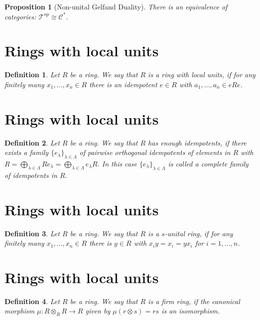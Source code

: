 \documentclass{amsart}
\newtheorem{proposition}{Proposition}[section]
\newtheorem{definition}{Definition}[section]
\begin{document}
\begin{proposition}[Non-unital Gelfand Duality]
There is an equivalence of categories: $\mathcal{T}^{op}\cong \mathcal{C}^*$.
\end{proposition}

\cite{murphy2014c}

\section{Rings with local units}

\begin{definition}
Let $R$ be a ring. We say that $R$ is a ring with local units, if for any finitely many $x_1,\dots,x_n\in R$ there is an idempotent $e\in R$ with $a_1,\dots,a_n\in eRe$.
\end{definition}


\section{Rings with local units}
\begin{definition}
Let $R$ be a ring. We say that $R$ has enough idempotents, if there exists a family $\{e_\lambda\}_{\lambda\in\Lambda}$ of pairwise orthogonal idempotents of elements in $R$ with $R=\bigoplus_{\lambda\in\Lambda}Re_\lambda=\bigoplus_{\lambda\in\Lambda}e_\lambda R$. In this case $\{e_\lambda\}_{\lambda\in\Lambda}$ is called a complete family of idempotents in $R$. 
\end{definition}


\section{Rings with local units}
\begin{definition}
Let $R$ be a ring. We say that $R$ is a $s$-unital ring, if for any finitely many $x_1,\dots,x_n\in R$ there is $y\in R$ with $x_iy=x_i=yx_i$ for $i=1,\dots,n$.
\end{definition}


\section{Rings with local units}
\begin{definition}
Let $R$ be a ring. We say that $R$ is a firm ring, if the canonical morphism $\mu\colon R\otimes_R R\longrightarrow R$ given by $\mu(r\otimes s)=rs$ is an isomorphism.
\end{definition}
\end{document}
